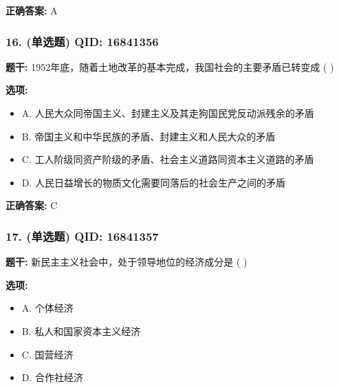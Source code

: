 \documentclass[12pt,UTF8]{ctexart}
\begin{document}
\textbf{正确答案:}
A

\vspace{0.3em}\hrulefill\vspace{0.7em}

\subsubsection*{16. (单选题) \small QID: 16841356}

\textbf{题干:}
1952年底，随着土地改革的基本完成，我国社会的主要矛盾已转变成 ( )

\textbf{选项:}
\begin{itemize}[leftmargin=*]

  \item A. 人民大众同帝国主义、封建主义及其走狗国民党反动派残余的矛盾

  \item B. 帝国主义和中华民族的矛盾、封建主义和人民大众的矛盾

  \item C. 工人阶级同资产阶级的矛盾、社会主义道路同资本主义道路的矛盾

  \item D. 人民日益增长的物质文化需要同落后的社会生产之间的矛盾

\end{itemize}

\textbf{正确答案:}
C

\vspace{0.3em}\hrulefill\vspace{0.7em}

\subsubsection*{17. (单选题) \small QID: 16841357}

\textbf{题干:}
新民主主义社会中，处于领导地位的经济成分是 ( )

\textbf{选项:}
\begin{itemize}[leftmargin=*]

  \item A. 个体经济

  \item B. 私人和国家资本主义经济

  \item C. 国营经济

  \item D. 合作社经济

\end{itemize}
\end{document}

